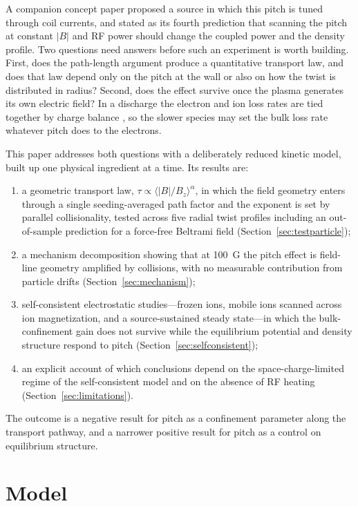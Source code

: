 \documentclass[11pt]{article}
\begin{document}
A companion concept paper \cite{auerbach2026} proposed a source in which this pitch is tuned through coil currents, and stated as its fourth prediction that scanning the pitch at constant $|B|$ and RF power should change the coupled power and the density profile. Two questions need answers before such an experiment is worth building. First, does the path-length argument produce a quantitative transport law, and does that law depend only on the pitch at the wall or also on how the twist is distributed in radius? Second, does the effect survive once the plasma generates its own electric field? In a discharge the electron and ion loss rates are tied together by charge balance \cite{lieberman,simon1955}, so the slower species may set the bulk loss rate whatever pitch does to the electrons.

This paper addresses both questions with a deliberately reduced kinetic model, built up one physical ingredient at a time. Its results are:
\begin{enumerate}
  \item a geometric transport law, $\tau \propto \langle |B|/B_z \rangle^{\alpha}$, in which the field geometry enters through a single seeding-averaged path factor and the exponent is set by parallel collisionality, tested across five radial twist profiles including an out-of-sample prediction for a force-free Beltrami field (Section~\ref{sec:testparticle});
  \item a mechanism decomposition showing that at 100~G the pitch effect is field-line geometry amplified by collisions, with no measurable contribution from particle drifts (Section~\ref{sec:mechanism});
  \item self-consistent electrostatic studies---frozen ions, mobile ions scanned across ion magnetization, and a source-sustained steady state---in which the bulk-confinement gain does not survive while the equilibrium potential and density structure respond to pitch (Section~\ref{sec:selfconsistent});
  \item an explicit account of which conclusions depend on the space-charge-limited regime of the self-consistent model and on the absence of RF heating (Section~\ref{sec:limitations}).
\end{enumerate}
The outcome is a negative result for pitch as a confinement parameter along the transport pathway, and a narrower positive result for pitch as a control on equilibrium structure.

\section{Model}
\label{sec:model}
\end{document}
